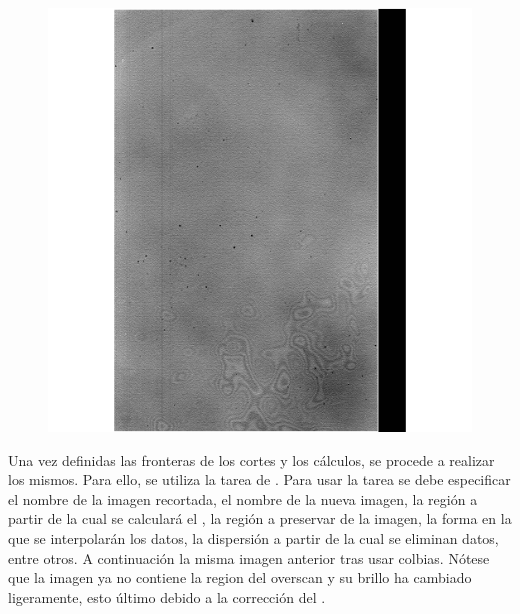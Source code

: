 \documentclass[12pt]{article}
\begin{document}
\begin{figure}[H]
  \centering
   \includegraphics[scale= 0.5]{im02.png}
  \label{im02}
\end{figure}


Una vez definidas las fronteras de los cortes y los cálculos, se procede a realizar los mismos. Para ello, se utiliza la tarea  de  . Para usar la tarea se debe especificar el nombre de la imagen recortada, el nombre de la nueva imagen, la región a partir de la cual se calculará el , la región a preservar de la imagen, la forma en la que se interpolarán los datos, la dispersión a partir de la cual se eliminan datos, entre otros. A continuación la misma imagen anterior tras usar colbias. Nótese que la imagen ya no contiene la region del overscan y su brillo ha cambiado ligeramente, esto último debido a la corrección del .
\end{document}
